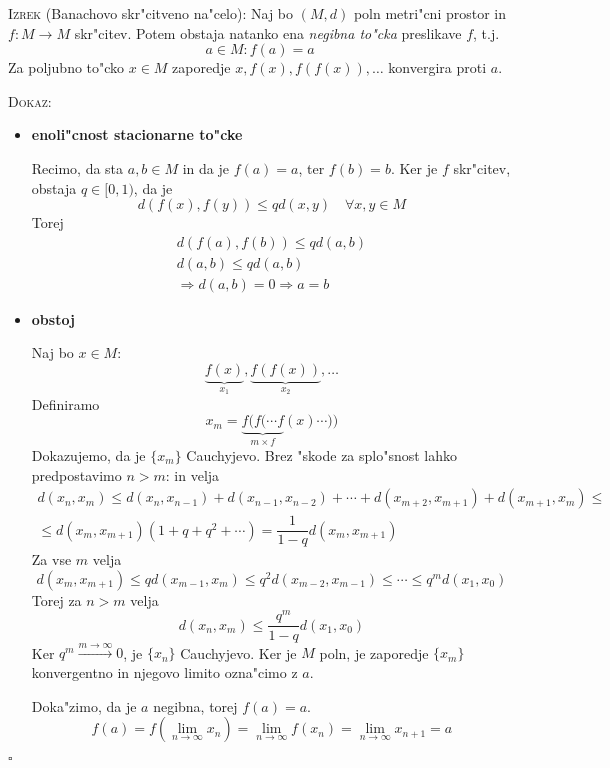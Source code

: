 \textsc{Izrek} (Banachovo skr"citveno na"celo): Naj bo $(M, d)$ poln metri"cni prostor in $f: M \to M$ skr"citev. Potem obstaja natanko ena \emph{negibna to"cka} preslikave $f$, t.j.
\begin{equation*}
a \in M: f(a) = a
\end{equation*}
Za poljubno to"cko $x \in M$ zaporedje $x, f(x), f(f(x)), \ldots$ konvergira proti $a$.

\textsc{Dokaz:}
\begin{itemize}
    \item \textbf{enoli"cnost stacionarne to"cke}
    
    Recimo, da sta $a, b \in M$ in da je $f(a) = a$, ter $f(b) = b$. Ker je $f$ skr"citev, obstaja $q \in [0, 1)$, da je
    \begin{equation*}
    d(f(x), f(y)) \leq q d(x, y) \quad \forall x,y \in M
    \end{equation*}
    Torej 
    \begin{gather*}
    d(f(a), f(b)) \leq q d(a, b) \\
    d(a, b) \leq q d(a, b) \\
    \Rightarrow d(a, b) = 0 \Rightarrow a = b
    \end{gather*}
    
    \item \textbf{obstoj}
    
    Naj bo $x \in M$:
    \begin{equation*}
    \underbrace{f(x)}_{x_1}, \underbrace{f(f(x))}_{x_2}, \ldots
    \end{equation*}
    Definiramo
    \begin{equation*}
    x_m = \underbrace{f(f( \cdots f}_{m \times f}(x) \cdots ))
    \end{equation*}
    Dokazujemo, da je $\{ x_m \}$ Cauchyjevo. Brez "skode za splo"snost lahko predpostavimo $n > m$: in velja
    \begin{multline*}
    d(x_n, x_m) \leq d(x_n, x_{n-1}) + d(x_{n-1}, x_{n-2}) + \cdots + d(x_{m+2}, x_{m+1}) + d(x_{m+1}, x_m) \leq \\
    \leq d(x_m, x_{m+1}) (1 + q + q^2 + \cdots) = \dfrac{1}{1-q} d(x_m, x_{m+1})
    \end{multline*}
    Za vse $m$ velja
    \begin{equation*}
    d(x_m, x_{m+1}) \leq q d(x_{m-1}, x_m) \leq q^2 d(x_{m-2}, x_{m-1}) \leq \cdots \leq q^m d(x_1, x_0)
    \end{equation*}
    Torej za $n > m$ velja
    \begin{equation*}
    d(x_n, x_m) \leq \dfrac{q^m}{1 - q} d(x_1, x_0)
    \end{equation*}
    Ker $q^m \stackrel{m \to \infty}{\longrightarrow} 0$, je $\{ x_n \}$ Cauchyjevo. Ker je $M$ poln, je zaporedje $\{ x_m \}$ konvergentno in njegovo limito ozna"cimo z $a$.
    
    Doka"zimo, da je $a$ negibna, torej $f(a) = a$.
    \begin{equation*}
    f(a) = f(\lim_{n \to \infty} x_n) = \lim_{n \to \infty} f(x_n) = \lim_{n \to \infty} x_{n+1} = a
    \end{equation*}
\end{itemize}
\hfill $\square$

